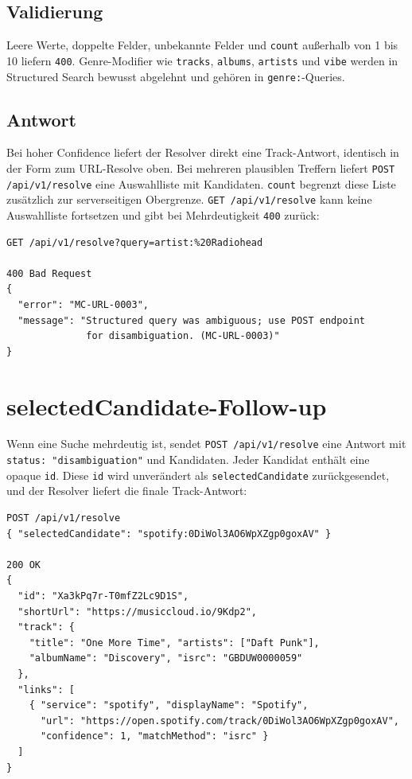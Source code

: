 \documentclass[11pt,a4paper]{article}
\newcommand{\code}[1]{\texttt{#1}}
\begin{document}
\subsection{Validierung}

Leere Werte, doppelte Felder, unbekannte Felder und \code{count} außerhalb von 1 bis 10 liefern \code{400}. Genre-Modifier wie \code{tracks}, \code{albums}, \code{artists} und \code{vibe} werden in Structured Search bewusst abgelehnt und gehören in \code{genre:}-Queries.

\subsection{Antwort}

Bei hoher Confidence liefert der Resolver direkt eine Track-Antwort, identisch in der Form zum URL-Resolve oben. Bei mehreren plausiblen Treffern liefert \code{POST /api/v1/resolve} eine Auswahlliste mit Kandidaten. \code{count} begrenzt diese Liste zusätzlich zur serverseitigen Obergrenze. \code{GET /api/v1/resolve} kann keine Auswahlliste fortsetzen und gibt bei Mehrdeutigkeit \code{400} zurück:

\begingroup\small\begin{verbatim}
GET /api/v1/resolve?query=artist:%20Radiohead

400 Bad Request
{
  "error": "MC-URL-0003",
  "message": "Structured query was ambiguous; use POST endpoint
              for disambiguation. (MC-URL-0003)"
}
\end{verbatim}\endgroup

\section{selectedCandidate-Follow-up}

Wenn eine Suche mehrdeutig ist, sendet \code{POST /api/v1/resolve} eine Antwort mit \code{status: "disambiguation"} und Kandidaten. Jeder Kandidat enthält eine opaque \code{id}. Diese \code{id} wird unverändert als \code{selectedCandidate} zurückgesendet, und der Resolver liefert die finale Track-Antwort:

\begingroup\small\begin{verbatim}
POST /api/v1/resolve
{ "selectedCandidate": "spotify:0DiWol3AO6WpXZgp0goxAV" }

200 OK
{
  "id": "Xa3kPq7r-T0mfZ2Lc9D1S",
  "shortUrl": "https://musiccloud.io/9Kdp2",
  "track": {
    "title": "One More Time", "artists": ["Daft Punk"],
    "albumName": "Discovery", "isrc": "GBDUW0000059"
  },
  "links": [
    { "service": "spotify", "displayName": "Spotify",
      "url": "https://open.spotify.com/track/0DiWol3AO6WpXZgp0goxAV",
      "confidence": 1, "matchMethod": "isrc" }
  ]
}
\end{verbatim}\endgroup
\end{document}
